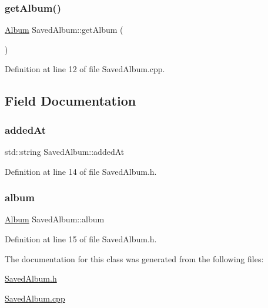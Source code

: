 \mbox{\label{class_saved_album_a10cedd17e53f2c395da2475a4005ee5a}} 
\subsubsection{\texorpdfstring{get\+Album()}{getAlbum()}}
{\footnotesize\ttfamily \mbox{\hyperlink{class_album}{Album}} Saved\+Album\+::get\+Album (\begin{DoxyParamCaption}{ }\end{DoxyParamCaption})}



Definition at line 12 of file Saved\+Album.\+cpp.



\subsection{Field Documentation}
\mbox{\label{class_saved_album_a53127fe89be1eb579270e0474d31f48b}} 
\subsubsection{\texorpdfstring{added\+At}{addedAt}}
{\footnotesize\ttfamily std\+::string Saved\+Album\+::added\+At\hspace{0.3cm}{\ttfamily [private]}}



Definition at line 14 of file Saved\+Album.\+h.

\mbox{\label{class_saved_album_aee563ebdf3372113724804230bab8cdb}} 
\subsubsection{\texorpdfstring{album}{album}}
{\footnotesize\ttfamily \mbox{\hyperlink{class_album}{Album}} Saved\+Album\+::album\hspace{0.3cm}{\ttfamily [private]}}



Definition at line 15 of file Saved\+Album.\+h.



The documentation for this class was generated from the following files\+:\begin{DoxyCompactItemize}
\item 
\mbox{\hyperlink{_saved_album_8h}{Saved\+Album.\+h}}\item 
\mbox{\hyperlink{_saved_album_8cpp}{Saved\+Album.\+cpp}}\end{DoxyCompactItemize}
